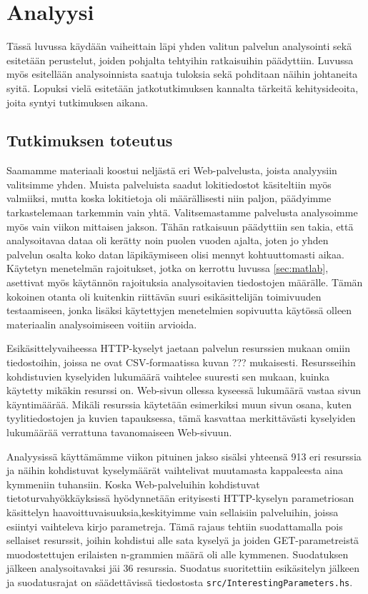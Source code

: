 
\chapter{Analyysi}

Tässä luvussa käydään vaiheittain läpi yhden valitun palvelun analysointi sekä esitetään perustelut, joiden pohjalta tehtyihin ratkaisuihin päädyttiin. 
Luvussa myös esitellään analysoinnista saatuja tuloksia sekä pohditaan näihin johtaneita syitä. Lopuksi vielä esitetään jatkotutkimuksen kannalta 
tärkeitä kehitysideoita, joita syntyi tutkimuksen aikana. 
 
\section{Tutkimuksen toteutus}

Saamamme materiaali koostui neljästä eri Web-palvelusta, joista analyysiin valitsimme yhden. Muista palveluista saadut lokitiedostot käsiteltiin
myös valmiiksi, mutta koska lokitietoja oli määrällisesti niin paljon, päädyimme tarkastelemaan tarkemmin vain yhtä. Valitsemastamme palvelusta
analysoimme myös vain viikon mittaisen jakson. Tähän ratkaisuun päädyttiin sen takia, että analysoitavaa dataa oli kerätty noin puolen vuoden ajalta,
joten jo yhden palvelun osalta koko datan läpikäymiseen olisi mennyt kohtuuttomasti aikaa. Käytetyn menetelmän rajoitukset, jotka on kerrottu luvussa \ref{sec:matlab},
asettivat myös käytännön rajoituksia analysoitavien tiedostojen määrälle. Tämän kokoinen otanta oli kuitenkin riittävän suuri esikäsittelijän toimivuuden
testaamiseen, jonka lisäksi käytettyjen menetelmien sopivuutta käytössä olleen materiaalin analysoimiseen voitiin arvioida. 

Esikäsittelyvaiheessa HTTP-kyselyt jaetaan palvelun resurssien mukaan
omiin tiedostoihin, joissa ne ovat CSV-formaatissa kuvan ???
mukaisesti.  Resursseihin kohdistuvien kyselyiden lukumäärä vaihtelee
suuresti sen mukaan, kuinka käytetty mikäkin resurssi on. Web-sivun
ollessa kyseessä lukumäärä vastaa sivun käyntimäärää. Mikäli resurssia
käytetään esimerkiksi muun sivun osana, kuten tyylitiedostojen ja
kuvien tapauksessa, tämä kasvattaa merkittävästi kyselyiden lukumäärää
verrattuna tavanomaiseen Web-sivuun.

Analyysissä käyttämämme viikon pituinen jakso sisälsi yhteensä 913 eri
resurssia ja näihin kohdistuvat kyselymäärät vaihtelivat muutamasta
kappaleesta aina kymmeniin tuhansiin. Koska Web-palveluihin kohdistuvat 
tietoturvahyökkäyksissä hyödynnetään erityisesti HTTP-kyselyn parametriosan 
käsittelyn haavoittuvaisuuksia,keskityimme vain sellaisiin palveluihin, joissa 
esiintyi vaihteleva kirjo parametreja. Tämä rajaus tehtiin suodattamalla pois sellaiset
resurssit, joihin kohdistui alle sata kyselyä ja joiden
GET-parametreistä muodostettujen erilaisten n-grammien määrä oli alle
kymmenen. Suodatuksen jälkeen analysoitavaksi jäi 36
resurssia. Suodatus suoritettiin esikäsitelyn jälkeen ja
suodatusrajat on säädettävissä tiedostosta
\texttt{src/InterestingParameters.hs}.

